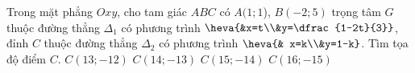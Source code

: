 \begin{ex}%
	Trong mặt phẳng $Oxy$, cho tam giác $ABC$ có $A(1;1$), $B(-2;5)$ trọng tâm $G$ thuộc đường thẳng $\Delta_1$ có phương trình $\heva{&x=t\\&y=\dfrac{1-2t}{3}}$, đỉnh $C$ thuộc đường thẳng $\Delta_2$ có phương trình $\heva{& x=k\\&y=1-k}$. Tìm tọa độ điểm $C$. \choice
	{$C(13; -12)$}
	{$C(14;-13)$}
	{$C(15;-14)$}
	{\True $C(16;-15)$}
\end{ex}


